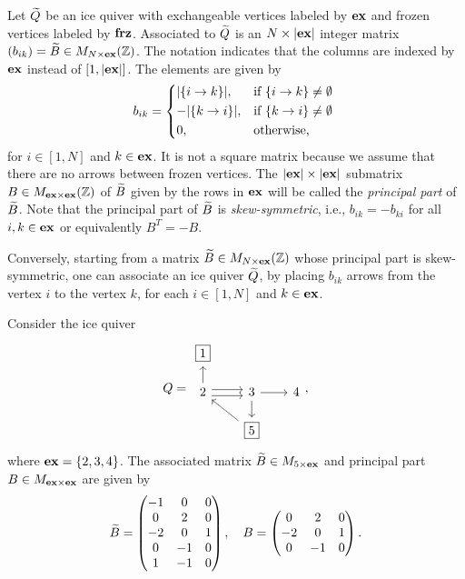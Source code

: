 Let $\widetilde{Q}$ be an ice quiver with exchangeable vertices labeled by $\mathbf{ex}$ and frozen
vertices labeled by $\mathbf{frz}$. Associated to $\widetilde{Q}$ is an $N \times |\mathbf{ex}|$ integer matrix
$(b_{ik}) = \widetilde{B} \in M_{N \times \mathbf{ex}}(\mathbb{Z})$. The notation indicates that the columns
are indexed by $\mathbf{ex}$ instead of $[1, |\mathbf{ex}|]$. The elements are given by
\begin{equation*}
	b_{ik} = \begin{dcases*}
		|\{ i \to k\}|, & if $\{i \to k\} \neq \emptyset$ \\
		-|\{k \to i\}|, & if $\{k \to i\} \neq \emptyset$ \\
		0,              & otherwise,
	\end{dcases*}
\end{equation*}
%
for $i \in [1, N]$ and $k \in \mathbf{ex}$. It is not a square matrix because we assume that
there are no arrows between frozen vertices. The $|\mathbf{ex}| \times |\mathbf{ex}|$ submatrix $B \in
	M_{\mathbf{ex} \times \mathbf{ex}}(\mathbb{Z})$ of $\widetilde{B}$ given by the rows in $\mathbf{ex}$ will be called the
\emph{principal part} of $\widetilde{B}$. Note that the principal part of
$\widetilde{B}$ is \emph{skew-symmetric},
i.e., $b_{ik} = - b_{ki}$ for all $i,k \in \mathbf{ex}$ or equivalently $B^T = - B$.

Conversely, starting from a matrix $\widetilde{B} \in M_{N \times \mathbf{ex}}(\mathbb{Z})$ whose principal
part is skew-symmetric, one can associate an ice quiver $\widetilde{Q}$, by placing $b_{ik}$
arrows from the vertex $i$ to the vertex $k$, for each $i \in [1, N]$ and $k \in \mathbf{ex}$.

\begin{example}
	Consider the ice quiver
	\begin{equation*}
		Q = \begin{tikzcd}[sep=scriptsize]
			\boxed{1} \\
			2 \uar \rar[shift left]\rar[shift right] & 3  \rar \dar & 4 \\
			& \boxed{5} \ular
		\end{tikzcd},
	\end{equation*}
	where $\mathbf{ex} = \{2,3,4\}$. The associated matrix $\widetilde{B} \in M_{5 \times \mathbf{ex}}$ and principal
	part $B \in M_{\mathbf{ex} \times \mathbf{ex}}$ are given by
	\begin{equation*}
		\widetilde{B} =
		\begin{pmatrix}
			-1 & 0  & 0 \\
			0  & 2  & 0 \\
			-2 & 0  & 1 \\
			0  & -1 & 0 \\
			1  & -1 & 0
		\end{pmatrix}
		,\quad B =
		\begin{pmatrix}
			0  & 2  & 0 \\
			-2 & 0  & 1 \\
			0  & -1 & 0
		\end{pmatrix}.
	\end{equation*}
\end{example}


